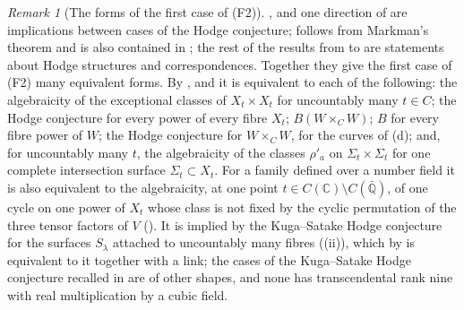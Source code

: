 \documentclass[11pt,reqno]{amsart}
\theoremstyle{plain}
\theoremstyle{definition}
\theoremstyle{remark}
\newtheorem{remark}[theorem]{Remark}
\newcommand{\QQ}{\mathbb{Q}}
\newcommand{\CC}{\mathbb{C}}
\begin{document}
\begin{remark}[The forms of the first case of (F2)]\label{rem:mumfordpowersopen}
,  and one direction of
 are implications between cases of the Hodge
conjecture;  follows from Markman's theorem and
is also contained in \cite{Li26}; the rest of the results from
 to  are statements about
Hodge structures and correspondences. Together they give the first case of
(F2) many equivalent forms. By ,  and
 it is equivalent to each of the following: the
algebraicity of the exceptional classes of $X_{t}\times X_{t}$ for uncountably
many $t\in C$; the Hodge conjecture for every power of every fibre $X_{t}$;
$B(W\times_{C}W)$; $B$ for every fibre power of $W$; the Hodge conjecture for
$W\times_{C}W$, for the curves of (d); and, for
uncountably many $t$, the algebraicity of the classes $\rho'_{a}$ on
$\Sigma_{t}\times\Sigma_{t}$ for one complete intersection surface
$\Sigma_{t}\subset X_{t}$. For a family defined over a number field it is
also equivalent to the algebraicity, at one point $t\in C(\CC)\setminus
C(\bar{\QQ})$, of one cycle on one power of $X_{t}$ whose class is not fixed
by the cyclic permutation of the three tensor factors of $V$
(). It is implied by the Kuga--Satake Hodge
conjecture for the surfaces $S_{\lambda}$ attached to uncountably many fibres
((ii)), which by  is equivalent
to it together with a link; the cases of the Kuga--Satake Hodge conjecture
recalled in  are of other shapes, and none has
transcendental rank nine with real multiplication by a cubic field.


\end{remark}
\end{document}
